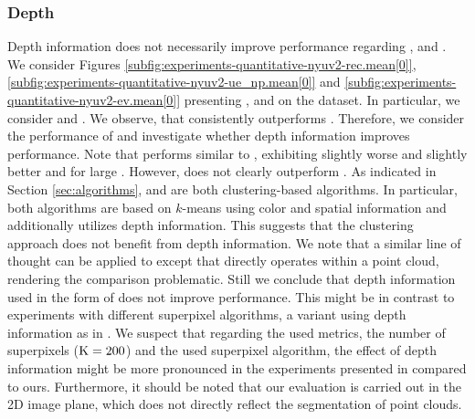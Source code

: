 \subsubsection{Depth}

Depth information does not necessarily improve performance regarding \Rec, \UE and \EV.
We consider Figures \ref{subfig:experiments-quantitative-nyuv2-rec.mean[0]},
\ref{subfig:experiments-quantitative-nyuv2-ue_np.mean[0]} and \ref{subfig:experiments-quantitative-nyuv2-ev.mean[0]}
presenting \Rec, \UE and \EV on the \NYU dataset. In particular, we consider \DASPr and \VCCSr.
We observe, that \DASPr consistently outperforms \VCCSr.
Therefore, we consider the performance of \DASPr and investigate whether depth information
improves performance. Note that \DASPr performs similar to \SLICr, exhibiting slightly
worse \Rec and slightly better \UE and \EV for large \K. However, \DASPr does not
clearly outperform \SLICr. As indicated in Section \ref{sec:algorithms}, \DASP and \SLIC are
both clustering-based algorithms. In particular, both algorithms are based on $k$-means
using color and spatial information and \DASPr additionally utilizes depth information.
This suggests that the clustering approach
does not benefit from depth information. We note that a similar line of thought can be
applied to \VCCS except that \VCCS directly operates within a point cloud, rendering the
comparison problematic. Still we conclude that depth information used in the form of
\DASP does not improve performance. This might be in contrast to
experiments with different superpixel algorithms, \eg a \SLIC variant using depth information
as in \cite{ZhangKanSchwingUrtasun:2013}. We suspect that regarding the used metrics, the number of superpixels ($\text{K} = 200$)
and the used superpixel algorithm, the effect of depth information might be more pronounced 
in the experiments presented in \cite{ZhangKanSchwingUrtasun:2013} compared to ours.
Furthermore, it should be noted that our evaluation is carried out in the 2D image plane, 
which does not directly reflect the segmentation of point clouds.
